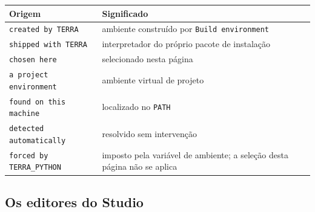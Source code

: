 \documentclass[12pt,a4paper]{article}
\begin{document}
\begin{center}
\label{tab:origem}
\small
\renewcommand{\arraystretch}{1.18}
\begin{tabular}{@{}L{3.6cm}L{12.0cm}@{}}
\toprule
\textbf{Origem} & \textbf{Significado} \\
\midrule
\texttt{created by TERRA}     & ambiente constru\'ido por \texttt{Build environment} \\
\texttt{shipped with TERRA}   & interpretador do pr\'oprio pacote de instala\c{c}\~ao \\
\texttt{chosen here}          & selecionado nesta p\'agina \\
\texttt{a project environment}& ambiente virtual de projeto \\
\texttt{found on this machine}& localizado no \texttt{PATH} \\
\texttt{detected automatically}& resolvido sem interven\c{c}\~ao \\
\texttt{forced by TERRA\_PYTHON} & imposto pela vari\'avel de ambiente; a sele\c{c}\~ao desta p\'agina n\~ao se aplica \\
\bottomrule
\end{tabular}
\end{center}

\subsection{Os editores do Studio}
\end{document}
